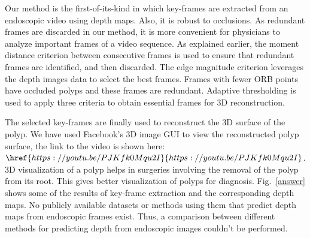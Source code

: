 \documentclass[journal]{IEEEtran}
\begin{document}
Our method is the first-of-its-kind in which key-frames are extracted from an endoscopic video using depth maps. Also, it is robust to occlusions. As redundant frames are discarded in our method, it is more convenient for physicians to analyze important frames of a video sequence. As explained earlier, the moment distance criterion between consecutive frames is used to ensure that redundant frames are identified, and then discarded. The edge magnitude criterion leverages the depth images data to select the best frames. Frames with fewer ORB points have occluded polyps and these frames are redundant. Adaptive thresholding is used to apply three criteria to obtain essential frames for 3D reconstruction.


The selected key-frames are finally used to reconstruct the 3D surface of the polyp. We have used Facebook's 3D image GUI to view the reconstructed polyp surface, the link to the video is shown here: 
$\href{https://youtu.be/PJKfk0Mqu2I}{https://youtu.be/PJKfk0Mqu2I}$. 3D visualization of a polyp helps in surgeries involving the removal of the polyp from its root. This gives better visualization of polyps for diagnosis. Fig.~\ref{answer} shows some of the results of key-frame extraction and the corresponding depth maps. No publicly available datasets or methods using them that predict depth maps from endoscopic frames exist. Thus, a comparison between different methods for predicting depth from endoscopic images couldn't be performed. 
\end{document}
